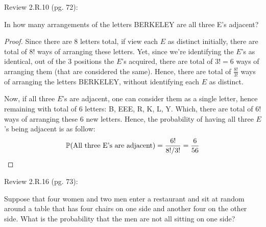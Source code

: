\documentclass{article}
\begin{document}
\hfil

\begin{ques}\label{q8}
    Review 2.R.10 (pg. 72):

    In how many arrangements of the letters BERKELEY are all three E's adjacent?
\end{ques}

\begin{proof}
    Since there are $8$ letters total, if view each $E$ as distinct initially, there are total of $8!$ ways of arranging these letters. Yet, since we're identifying the $E$'s as identical, out of the $3$ positions the $E$'s acquired, there are total of $3!=6$ ways of arranging them (that are considered the same). Hence, there are total of $\frac{8!}{3!}$ ways of arranging the letters BERKELEY, without identifying each $E$ as distinct.

    \hfil

    Now, if all three $E$'s are adjacent, one can consider them as a single letter, hence remaining with total of $6$ letters: B, EEE, R, K, L, Y. Which, there are total of $6!$ ways of arranging these $6$ new letters. Hence, the probability of having all three $E$'s being adjacent is as follow:
    \begin{align}
        \mathbb{P}(\textmd{All three E's are adjacent})= \frac{6!}{8!/3!} = \frac{6}{56}
    \end{align}
\end{proof}

\hfil

\begin{ques}\label{q9}
    Review 2.R.16 (pg. 73):

    Suppose that four women and two men enter a restaurant and sit at random around a table that has four chairs on one side and another four on the other side. What is the probability that the men are not all sitting on one side?
\end{ques}
\end{document}

